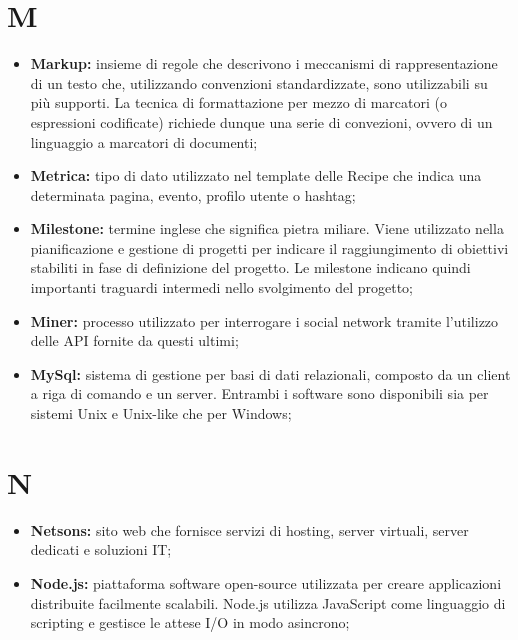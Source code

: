 \section*{\Huge M} %
\label{sec:m}
	\begin{itemize}
		\item \textbf{Markup:} insieme di regole che descrivono i meccanismi di rappresentazione di un testo che, utilizzando convenzioni standardizzate, sono utilizzabili su più supporti. La tecnica di formattazione per mezzo di marcatori (o espressioni codificate) richiede dunque una serie di convezioni, ovvero di un linguaggio a marcatori di documenti;
		\item \textbf{Metrica:} tipo di dato utilizzato nel template delle Recipe che indica una determinata pagina, evento, profilo utente o hashtag;
		\item \textbf{Milestone:} termine inglese che significa pietra miliare. Viene utilizzato nella pianificazione e gestione di progetti per indicare il raggiungimento di obiettivi stabiliti in fase di definizione del progetto. Le milestone indicano quindi importanti traguardi intermedi nello svolgimento del progetto;
		\item \textbf{Miner:} processo utilizzato per interrogare i social network tramite l'utilizzo delle API fornite da questi ultimi;	
		\item \textbf{MySql:} sistema di gestione per basi di dati relazionali, composto da un client a riga di comando e un server. Entrambi i software sono disponibili sia per sistemi Unix e Unix-like che per Windows;
	\end{itemize}
\pagebreak

\section*{\Huge N} %
\label{sec:n}
	\begin{itemize}
		\item \textbf{Netsons:} sito web che fornisce servizi di hosting, server virtuali, server dedicati e soluzioni IT;
		\item \textbf{Node.js:} piattaforma software open-source utilizzata per creare applicazioni distribuite facilmente scalabili. Node.js utilizza JavaScript come linguaggio di scripting e gestisce le attese I/O in modo asincrono;
	\end{itemize}
\pagebreak
